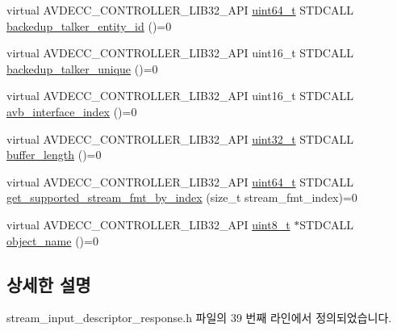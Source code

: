 \begin{DoxyCompactItemize}
\item 
virtual A\+V\+D\+E\+C\+C\+\_\+\+C\+O\+N\+T\+R\+O\+L\+L\+E\+R\+\_\+\+L\+I\+B32\+\_\+\+A\+PI \hyperlink{parse_8c_aec6fcb673ff035718c238c8c9d544c47}{uint64\+\_\+t} S\+T\+D\+C\+A\+LL \hyperlink{classavdecc__lib_1_1stream__input__descriptor__response_ae7d527febcff1dc1fa228cc197cf8e44}{backedup\+\_\+talker\+\_\+entity\+\_\+id} ()=0
\item 
virtual A\+V\+D\+E\+C\+C\+\_\+\+C\+O\+N\+T\+R\+O\+L\+L\+E\+R\+\_\+\+L\+I\+B32\+\_\+\+A\+PI uint16\+\_\+t S\+T\+D\+C\+A\+LL \hyperlink{classavdecc__lib_1_1stream__input__descriptor__response_a76c462953d0e3431cba9efb6d8ae5a87}{backedup\+\_\+talker\+\_\+unique} ()=0
\item 
virtual A\+V\+D\+E\+C\+C\+\_\+\+C\+O\+N\+T\+R\+O\+L\+L\+E\+R\+\_\+\+L\+I\+B32\+\_\+\+A\+PI uint16\+\_\+t S\+T\+D\+C\+A\+LL \hyperlink{classavdecc__lib_1_1stream__input__descriptor__response_a8a84689147c9ee2278a6d3692b1c5bb1}{avb\+\_\+interface\+\_\+index} ()=0
\item 
virtual A\+V\+D\+E\+C\+C\+\_\+\+C\+O\+N\+T\+R\+O\+L\+L\+E\+R\+\_\+\+L\+I\+B32\+\_\+\+A\+PI \hyperlink{parse_8c_a6eb1e68cc391dd753bc8ce896dbb8315}{uint32\+\_\+t} S\+T\+D\+C\+A\+LL \hyperlink{classavdecc__lib_1_1stream__input__descriptor__response_a659139f2462ec36f08178dff106e184d}{buffer\+\_\+length} ()=0
\item 
virtual A\+V\+D\+E\+C\+C\+\_\+\+C\+O\+N\+T\+R\+O\+L\+L\+E\+R\+\_\+\+L\+I\+B32\+\_\+\+A\+PI \hyperlink{parse_8c_aec6fcb673ff035718c238c8c9d544c47}{uint64\+\_\+t} S\+T\+D\+C\+A\+LL \hyperlink{classavdecc__lib_1_1stream__input__descriptor__response_a4e92ab02c01dc1343a66d43403e470a3}{get\+\_\+supported\+\_\+stream\+\_\+fmt\+\_\+by\+\_\+index} (size\+\_\+t stream\+\_\+fmt\+\_\+index)=0
\item 
virtual A\+V\+D\+E\+C\+C\+\_\+\+C\+O\+N\+T\+R\+O\+L\+L\+E\+R\+\_\+\+L\+I\+B32\+\_\+\+A\+PI \hyperlink{stdint_8h_aba7bc1797add20fe3efdf37ced1182c5}{uint8\+\_\+t} $\ast$S\+T\+D\+C\+A\+LL \hyperlink{classavdecc__lib_1_1descriptor__response__base_a133f7774946d80f82b8aaaa4cfbb7361}{object\+\_\+name} ()=0
\end{DoxyCompactItemize}


\subsection{상세한 설명}


stream\+\_\+input\+\_\+descriptor\+\_\+response.\+h 파일의 39 번째 라인에서 정의되었습니다.



